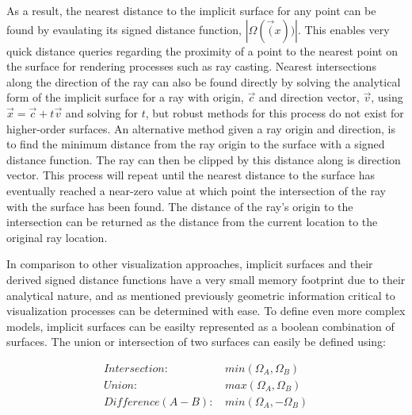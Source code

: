 \documentclass[12pt, a4paper]{article}
\begin{document}
As a result, the nearest distance to the implicit surface for any point can be found by evaulating its signed distance function, $|\Omega(\vec(x))|$. This enables very quick distance queries regarding the proximity of a point to the nearest point on the surface for rendering processes such as ray casting. Nearest intersections along the direction of the ray can also be found directly by solving the analytical form of the implicit surface for a ray with origin, $\vec{c}$ and direction vector, $\vec{v}$, using  $\vec{x} = \vec{c} + t\vec{v}$ and solving for $t$, but robust methods for this process do not exist for higher-order surfaces. An alternative method given a ray origin and direction, is to find the minimum distance from the ray origin to the surface with a signed distance function. The ray can then be clipped by this distance along is direction vector. This process will repeat until the nearest distance to the surface has eventually reached a near-zero value at which point the intersection of the ray with the surface has been found. The distance of the ray's origin to the intersection can be returned as the distance from the current location to the original ray location.

In comparison to other visualization approaches, implicit surfaces and their derived signed distance functions have a very small memory footprint due to their analytical nature, and as mentioned previously geometric information critical to visualization processes can be determined with ease. To define even more complex models, implicit surfaces can be easilty represented as a boolean combination of surfaces. The union or intersection of two surfaces can easily be defined using:

\begin{align*}
  Intersection: & \, min(\Omega_{A}, \Omega_{B}) \\
  Union: & \, max(\Omega_{A}, \Omega_{B}) \\
  Difference (A-B): & \, min(\Omega_{A}, -\Omega_{B}) \\
\end{align*}
\end{document}

